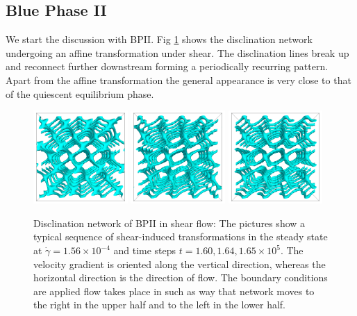 \documentclass[aps,pre,reprint,superscriptaddress]{revtex4}
\newcommand{\e}[1]{\times10^{#1}}
\newcommand{\gd}{\dot{\gamma}}
\begin{document}
\subsection{Blue Phase II}

We start the discussion with BPII. Fig \ref{bp2-med} shows the disclination network 
undergoing an affine transformation under shear. The disclination lines break up and 
reconnect further downstream forming a periodically recurring pattern. 
Apart from the affine transformation the general appearance is very close to that 
of the quiescent equilibrium phase.

\begin{figure}[h]
\includegraphics[width=0.32\textwidth]{disc-160k_run902.png}
\includegraphics[width=0.32\textwidth]{disc-164k_run902.png}
\includegraphics[width=0.32\textwidth]{disc-165k_run902.png}
\caption{Disclination network of BPII in shear flow: The pictures show a typical sequence 
of shear-induced transformations in the steady state at 
$\gd=1.56\e{-4}$ and time steps $t=1.60, 1.64,1.65\e{5}$. The velocity gradient 
is oriented along the vertical direction, whereas the horizontal direction is the direction of flow. 
The boundary conditions are applied flow takes place in such as way that network moves 
to the right in the upper half and to the left in the lower half.}
\label{bp2-med}
\end{figure}
\end{document}
